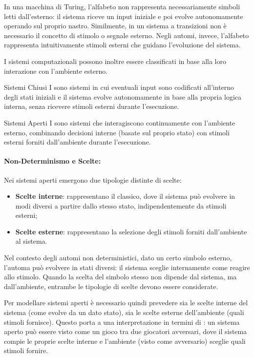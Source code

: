 In una macchina di Turing, l'alfabeto non rappresenta necessariamente simboli letti dall'esterno: il sistema riceve un input iniziale e poi evolve autonomamente operando sul proprio nastro.
Similmente, in un sistema a transizioni non è necessario il concetto di stimolo o segnale esterno. Negli automi, invece, l'alfabeto rappresenta intuitivamente stimoli esterni che guidano l'evoluzione del sistema.

I sistemi computazionali possono inoltre essere classificati in base alla loro interazione con l'ambiente esterno.

\begin{definition}{Sistemi Chiusi}
  I  sono sistemi in cui eventuali input sono codificati all'interno degli stati iniziali e il sistema evolve autonomamente in base alla propria logica interna, senza ricevere stimoli esterni durante l'esecuzione.
\end{definition}

\begin{definition}{Sistemi Aperti}
  I  sono sistemi che interagiscono continuamente con l'ambiente esterno, combinando decisioni interne (basate sul proprio stato) con stimoli esterni forniti dall'ambiente durante l'esecuzione.
\end{definition}

\paragraph{Non-Determinismo e Scelte:}
Nei sistemi aperti emergono due tipologie distinte di scelte:
\begin{itemize}
  \item \textbf{Scelte interne}: rappresentano il  classico, dove il sistema può evolvere in modi diversi a partire dallo stesso stato, indipendentemente da stimoli esterni;
  \item \textbf{Scelte esterne}: rappresentano la selezione degli stimoli forniti dall'ambiente al sistema.
\end{itemize}

Nel contesto degli automi non deterministici, dato un certo simbolo esterno, l'automa può evolvere in stati diversi: il sistema sceglie internamente come reagire allo stimolo. Quando la scelta del simbolo stesso non dipende dal sistema, ma dall'ambiente, entrambe le tipologie di scelte devono essere considerate.

Per modellare sistemi aperti è necessario quindi prevedere sia le scelte interne del sistema (come evolve da un dato stato), sia le scelte esterne dell'ambiente (quali stimoli fornisce). Questo porta a una interpretazione in termini di : un sistema aperto può essere visto come un gioco tra due giocatori avversari, dove il sistema compie le proprie scelte interne e l'ambiente (visto come avversario) sceglie quali stimoli fornire.

